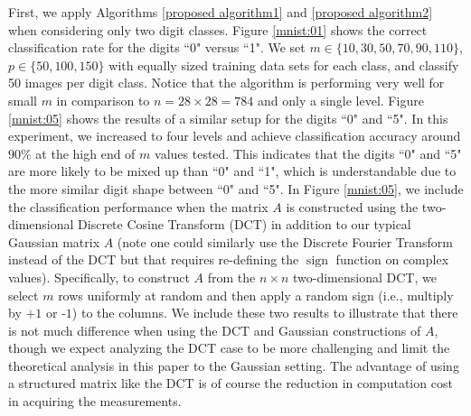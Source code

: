 \documentclass[twoside,11pt]{article}
\DeclareMathOperator*{\sign}{sign}
\newcommand{\edit}[1]{{{#1}}}
\begin{document}
First, we apply Algorithms \ref{proposed algorithm1} and \ref{proposed algorithm2} when considering only two digit classes. Figure \ref{mnist:01} shows the correct classification rate for the digits ``0" versus ``1". We set $m\in\{10,30,50,70,90,110\}$, $p\in\{50,100,150\}$ with equally sized training data sets for each class, and classify 50 images per digit class. Notice that the algorithm is performing very well for small $m$ in comparison to $n=28\times 28 =784$ and only a single \edit{level}. Figure \ref{mnist:05} shows the results of a similar setup for the digits ``0" and ``5". In this experiment, we increased  to four \edit{level}s and achieve classification accuracy around $90\%$ at the high end of $m$ values tested. This indicates that the digits ``0" and ``5" are more likely to be mixed up than ``0" and ``1", which is understandable due to the more similar digit shape between ``0" and ``5". \edit{In Figure \ref{mnist:05}, we include the classification performance when the matrix $A$ is constructed using the two-dimensional Discrete Cosine Transform (DCT) in addition to our typical Gaussian matrix $A$ (note one could similarly use the Discrete Fourier Transform instead of the DCT but that requires re-defining the $\sign$ function on complex values). Specifically, to construct $A$ from the $n\times n$ two-dimensional DCT, we select $m$ rows uniformly at random and then apply a random sign (i.e., multiply by $+1$ or -$1$) to the columns. We include these two results to illustrate that there is not much difference when using the DCT and Gaussian constructions of $A$, though we expect analyzing the DCT case to be more challenging and limit the theoretical analysis in this paper to the Gaussian setting.  The advantage of using a structured matrix like the DCT is of course the reduction in computation cost in acquiring the measurements.}
\end{document}
